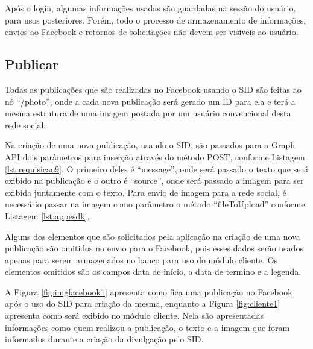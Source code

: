 Após o login, algumas informações usadas são guardadas na sessão do usuário, para usos posteriores. Porém, todo o processo de armazenamento de informações, envios ao Facebook e retornos de solicitações não devem ser visíveis ao usuário. 

\subsection{Publicar}
Todas as publicações que são realizadas no Facebook usando o SID são feitas ao nó ``/photo'', onde a cada nova publicação será gerado um ID para ela e terá a mesma estrutura de uma imagem postada por um usuário convencional desta rede social.

Na criação de uma nova publicação, usando o SID, são passados para a Graph API dois parâmetros para inserção através do método POST, conforme Listagem \ref{lst:requisicao9}. O primeiro deles é “message”, onde será passado o texto que será exibido na publicação e o outro é “source”, onde será passado a imagem para ser exibida juntamente com o texto. Para envio de imagem para a rede social, é necessário passar na imagem como parâmetro o método “fileToUpload” conforme Listagem \ref{lst:appesdk}. 

Alguns dos elementos que são solicitados pela aplicação na criação de uma nova publicação são omitidos no envio para o Facebook, pois esses dados serão usados apenas para serem armazenados no banco para uso do módulo cliente. Os elementos omitidos são os campos data de início, a data de termino e a legenda. 

A Figura \ref{fig:imgfacebook1} apresenta como fica uma publicação no Facebook após o uso do SID para criação da mesma, enquanto a Figura \ref{fig:cliente1} apresenta como será exibido no módulo cliente. Nela são apresentadas informações como quem realizou a publicação, o texto e a imagem que foram informados durante a criação da divulgação pelo SID.

